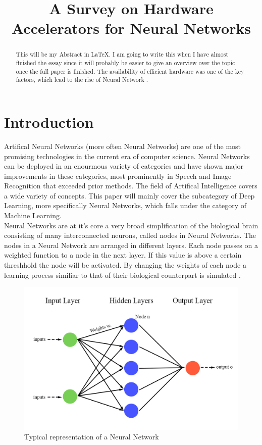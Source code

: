 \documentclass[conference]{IEEEtran}
\begin{document}
\title{A Survey on Hardware Accelerators for Neural Networks}
\author{
}

\maketitle

\begin{abstract}
This will be my Abstract in \LaTeX.
I am going to write this when I have almost finished the essay since it will probably be easier to give an overview over the topic once the full paper is finished.
The availability of efficient hardware was one of the key factors, which lead to the rise of Neural Network \cite{historyfpgas}. 
\\
\end{abstract}

\section{Introduction}
Artifical Neural Networks (more often Neural Networks) are one of the most promising technologies in the current era of computer science. Neural Networks can be deployed in an enourmous variety of categories and have shown major improvements in these categories, most prominently in Speech and Image Recognition \cite{speech_recognition1} that exceeded prior methods. The field of Artifical Intelligence covers a wide variety of concepts. This paper will mainly cover the subcategory of Deep Learning, more specifically Neural Networks, which falls under the category of Machine Learning. 
\\
Neural Networks are at it's core a very broad simplification of the biological brain consisting of many interconnected neurons, called nodes in Neural Networks. The nodes in a Neural Network are  arranged in different layers. Each node passes on a weighted function to a node in the next layer. If this value is above a certain threshhold the node will be activated. By changing the weights of each node a learning process similiar to that of their biological counterpart is simulated \cite{nn_basics}.
\begin{figure}[h]
	\caption{Typical representation of a Neural Network}
	\centering
	\includegraphics[width=\linewidth]{pictures/neuralnetwork.png}
\end{figure}
\end{document}
